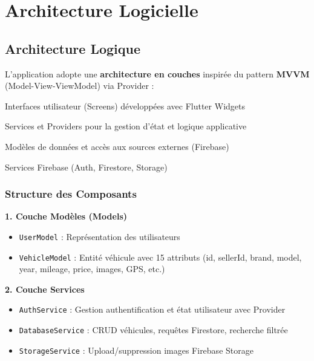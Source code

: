 \documentclass[11pt,a4paper]{article}
\begin{document}
\section{Architecture Logicielle}

\subsection{Architecture Logique}

L'application adopte une \textbf{architecture en couches} inspirée du pattern \textbf{MVVM} (Model-View-ViewModel) via Provider :

\begin{tcolorbox}[colback=primarycolor!5,colframe=primarycolor,title=Couches de l'Application]
\begin{description}[leftmargin=2cm]
    \item[Présentation] Interfaces utilisateur (Screens) développées avec Flutter Widgets
    \item[Logique Métier] Services et Providers pour la gestion d'état et logique applicative
    \item[Données] Modèles de données et accès aux sources externes (Firebase)
    \item[Infrastructure] Services Firebase (Auth, Firestore, Storage)
\end{description}
\end{tcolorbox}

\subsubsection{Structure des Composants}

\textbf{1. Couche Modèles (Models)}
\begin{itemize}
    \item \texttt{UserModel} : Représentation des utilisateurs
    \item \texttt{VehicleModel} : Entité véhicule avec 15 attributs (id, sellerId, brand, model, year, mileage, price, images, GPS, etc.)
\end{itemize}

\textbf{2. Couche Services}
\begin{itemize}
    \item \texttt{AuthService} : Gestion authentification et état utilisateur avec Provider
    \item \texttt{DatabaseService} : CRUD véhicules, requêtes Firestore, recherche filtrée
    \item \texttt{StorageService} : Upload/suppression images Firebase Storage
\end{itemize}
\end{document}
